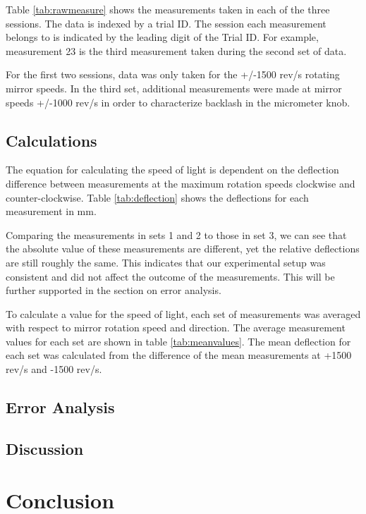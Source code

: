 \documentclass[twocolumn]{article}
\begin{document}
	Table \ref{tab:rawmeasure} shows the measurements taken in each of the three sessions.
	The data is indexed by a trial ID. 
	The session each measurement belongs to is indicated by the leading digit of the Trial ID. 
	For example, measurement 23 is the third measurement taken during the second set of data.
	
	For the first two sessions, data was only taken for the +/-1500 rev/s rotating mirror speeds. 
	In the third set, additional measurements were made at mirror speeds +/-1000 rev/s in order to characterize backlash in the micrometer knob.
	
	
	
	\subsection{Calculations}
	The equation for calculating the speed of light is dependent on the deflection difference between measurements at the maximum rotation speeds clockwise and counter-clockwise. 
	Table \ref{tab:deflection} shows the deflections for each measurement in mm.
	
	Comparing the measurements in sets 1 and 2 to those in set 3, we can see that the absolute value of these measurements are different, yet the relative deflections are still roughly the same. 
	This indicates that our experimental setup was consistent and did not affect the outcome of the measurements. 
	This will be further supported in the section on error analysis.
	
	To calculate a value for the speed of light, each set of measurements was averaged with respect to mirror rotation speed and direction. 
	The average measurement values for each set are shown in table \ref{tab:meanvalues}. 
	The mean deflection for each set was calculated from the difference of the mean measurements at +1500 rev/s and -1500 rev/s.
	
	
	\subsection{Error Analysis}
	\subsection{Discussion}

\section{Conclusion}
\end{document}
